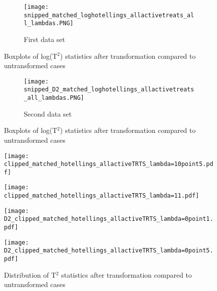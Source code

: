 \documentclass[11pt]{article}
\begin{document}
\clearpage
\begin{landscape}
\begin{figure}[ht!]
\begin{subfigure}{1\textwidth}
\centering
\texttt{[image: snipped\_matched\_loghotellings\_allactivetreats\_all\_lambdas.PNG]}
\caption*{First data set}
\end{subfigure}%
\caption{Boxplots of log(T$^2$) statistics after transformation compared to untransformed cases}
\label{boxt2}
\end{figure}
\end{landscape}

\begin{landscape}
\begin{figure}[ht!]
\ContinuedFloat
\begin{subfigure}{1\textwidth}
\centering
\texttt{[image: snipped\_D2\_matched\_loghotellings\_allactivetreats\_all\_lambdas.PNG]}
\caption*{Second data set}
\end{subfigure}%
\caption{Boxplots of log(T$^2$) statistics after transformation compared to untransformed cases}
\label{boxt2}
\end{figure} 
\end{landscape}

\clearpage
 \begin{figure}[ht!]
 \centering
  \begin{minipage}{.495\textwidth}
  \centering 
  \texttt{[image: clipped\_matched\_hotellings\_allactiveTRTS\_lambda=10point5.pdf]}
  \end{minipage}
 \begin{minipage}{.495\textwidth}
 \centering
  \texttt{[image: clipped\_matched\_hotellings\_allactiveTRTS\_lambda=11.pdf]}
 \end{minipage}
 \begin{minipage}{.495\textwidth}
 \centering
\texttt{[image: D2\_clipped\_matched\_hotellings\_allactiveTRTS\_lambda=0point1.pdf]}
 \end{minipage}
\begin{minipage}{.495\textwidth}
\centering
 \texttt{[image: D2\_clipped\_matched\_hotellings\_allactiveTRTS\_lambda=0point5.pdf]}
\end{minipage}
\caption{Distribution of T$^2$ statistics after transformation compared to untransformed cases}
\label{distt10505}
 \end{figure}
\end{document}
